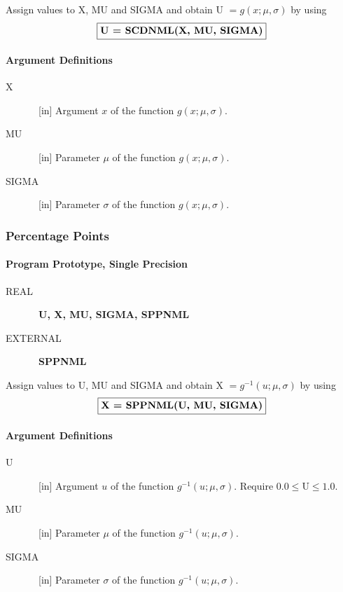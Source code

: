 \documentclass[twoside]{MATH77}
\begin{document}
Assign values to X, MU and SIGMA and obtain U $= g(x;\mu ,\sigma )$ by using
$$
\fbox{{\bf U = SCDNML(X, MU, SIGMA)}}
$$

\paragraph{Argument Definitions}

\begin{description}
\item[X]  \ [in] Argument $x$ of the function $g(x;\mu ,\sigma ).$

\item[MU]  \ [in] Parameter $\mu $ of the function $g(x;\mu ,\sigma ).$

\item[SIGMA]  \ [in] Parameter $\sigma $ of the function $g(x;\mu ,\sigma ).$
\end{description}

\subsubsection{Percentage Points}
\paragraph{Program Prototype, Single Precision}

\begin{description}
\item[REAL]  \ {\bf U, X, MU, SIGMA, SPPNML}

\item[EXTERNAL]  \ {\bf SPPNML}
\end{description}

Assign values to U, MU and SIGMA and obtain X $= g^{-1}(u;\mu ,\sigma )$ by
using
$$
\fbox{{\bf X = SPPNML(U, MU, SIGMA)}}
$$

\paragraph{Argument Definitions}

\begin{description}
\item[U]  \ [in] Argument $u$ of the function $g^{-1}(u;\mu ,\sigma ).$
Require $0.0 \leq \text{U} \leq 1.0.$

\item[MU]  \ [in] Parameter $\mu $ of the function $g^{-1}(u;\mu ,\sigma ).$

\item[SIGMA]  \ [in] Parameter $\sigma $ of the function $g^{-1}(u;\mu
,\sigma ).$
\end{description}
\end{document}
